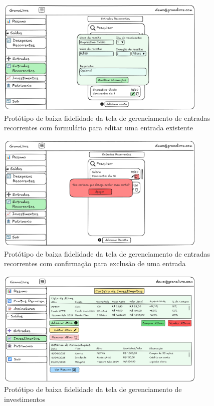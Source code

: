 \begin{figure}[H]
    \centering
    \includegraphics[width=0.9\textwidth]{imgs/07-entradas-recorrentes4.png}
    \caption{Protótipo de baixa fidelidade da tela de gerenciamento de entradas recorrentes com formulário para editar uma entrada existente}
    \label{fig:prot_entradas_recorrentes4}
\end{figure}

\begin{figure}[H]
    \centering
    \includegraphics[width=0.9\textwidth]{imgs/07-entradas-recorrentes5.png}
    \caption{Protótipo de baixa fidelidade da tela de gerenciamento de entradas recorrentes com confirmação para exclusão de uma entrada}
    \label{fig:prot_entradas_recorrentes5}
\end{figure}

\begin{figure}[H]
    \centering
    \includegraphics[width=0.9\textwidth]{imgs/08-investimentos.png}
    \caption{Protótipo de baixa fidelidade da tela de gerenciamento de investimentos}
    \label{fig:prot_investimentos}
\end{figure}

